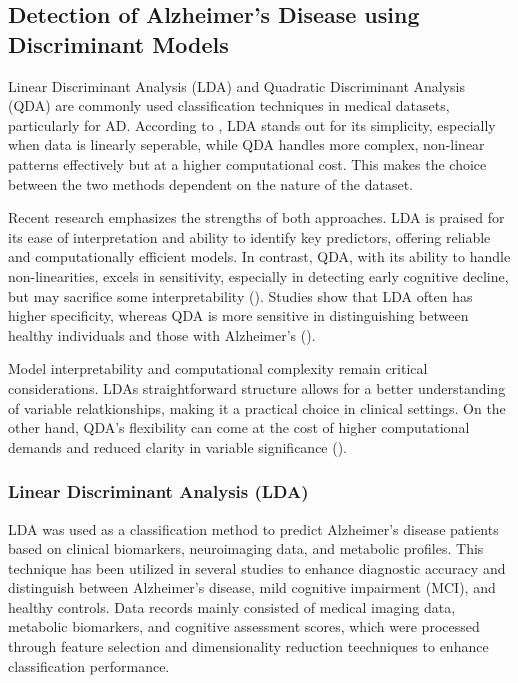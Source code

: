 \documentclass[12pt]{article}
\begin{document}
\subsection{Detection of Alzheimer's Disease using Discriminant Models}
\noindent

Linear Discriminant Analysis (LDA) and Quadratic Discriminant Analysis (QDA) are commonly used classification techniques in medical datasets, particularly for AD. According to \cite{jain2022}, LDA stands out for its simplicity, especially when data is linearly seperable, while QDA
handles more complex, non-linear patterns effectively but at a higher computational cost. This makes the choice between the two methods dependent on the nature of the dataset.

Recent research emphasizes the strengths of both approaches. LDA is praised for its ease of interpretation and ability to identify key predictors, offering reliable and computationally efficient models. In contrast, QDA, with its ability to handle non-linearities, excels in sensitivity, especially in
detecting early cognitive decline, but may sacrifice some interpretability (\cite{arbabshirani2017}). Studies show that LDA often has higher specificity, whereas QDA is more sensitive in distinguishing between healthy individuals and those with Alzheimer's (\cite{nguyen2020}).

Model interpretability and computational complexity remain critical considerations. LDAs straightforward structure allows for a better understanding of variable relatkionships, making it a practical choice in clinical settings. On the other hand, QDA's flexibility can come at the cost of higher
computational demands and reduced clarity in variable significance (\cite{wang2018}).

\subsubsection{Linear Discriminant Analysis (LDA)}
\noindent
LDA was used as a classification method to predict Alzheimer's disease patients based on clinical biomarkers, neuroimaging data, and metabolic profiles. This technique has been utilized in several studies to enhance diagnostic accuracy and distinguish between Alzheimer's disease, mild cognitive impairment
(MCI), and healthy controls. Data records mainly consisted of medical imaging data, metabolic biomarkers, and cognitive assessment scores, which were processed through feature selection and dimensionality reduction teechniques to enhance classification performance.
\end{document}
